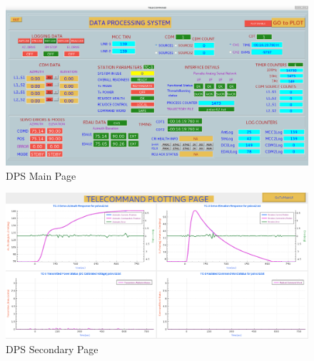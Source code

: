 \begin{figure}[H]
	\centering
	\includegraphics[height=1.2\linewidth, width=\linewidth]{./Diagrams/MainPage.png}
	\caption{DPS Main Page}
	\label{FIG:DPSMainPage}
\end{figure}
	   

\begin{figure}[H]
	\centering
	\includegraphics[height=1.2\linewidth, width=\linewidth]{./Diagrams/SecondaryPage.png}
	\caption{DPS Secondary Page}
	\label{FIG:DPSSecondPage}
\end{figure}